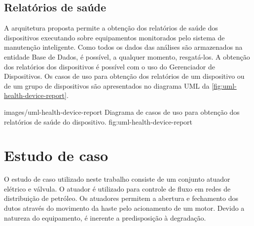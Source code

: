 %
%


\subsection{Relatórios de saúde}

A arquitetura proposta permite a obtenção dos relatórios de saúde dos dispositivos executando sobre
equipamentos monitorados pelo sistema de manutenção inteligente. Como todos os dados das análises
são armazenados na entidade Base de Dados, é possível, a qualquer momento, resgatá-los. A obtenção
dos relatórios dos dispositivos é possível com o uso do Gerenciador de Dispositivos. Os casos de uso
para obtenção dos relatórios de um dispositivo ou de um grupo de dispositivos são apresentados no
diagrama \gls{UML} da \cref{fig:uml-health-device-report}.

  {images/uml-health-device-report}
  {Diagrama de casos de uso para obtenção dos relatórios de saúde do dispositivo.}
  {fig:uml-health-device-report}


\section{Estudo de caso}
\label{sec:estudo-caso}

O estudo de caso utilizado neste trabalho consiste de um conjunto atuador elétrico e válvula. O
atuador é utilizado para controle de fluxo em redes de distribuição de petróleo. Os atuadores
permitem a abertura e fechamento dos dutos através do movimento da haste pelo acionamento de um
motor. Devido a natureza do equipamento, é inerente a predisposição à degradação.

